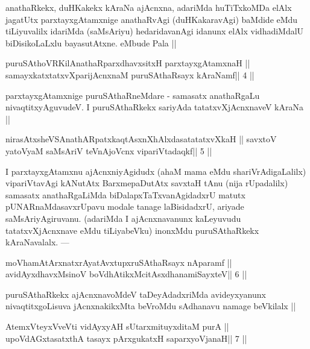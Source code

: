 \begin{artha}
anathaRkekx, duHKakekx kAraNa ajAcnxna, adariMda huTiTxkoMDa elAlx jagatUtx parxtayxgAtamxnige anathaRvAgi (duHKakaravAgi) baMdide eMdu tiLiyuvalilx idariMda (saMsAriyu) hedaridavanAgi idanunx elAlx vidhadiMdalU biDisikoLaLxlu bayasutAtxne. eMbude Pala ||
\end{artha}

\begin{shl}
puruSAthoVR\s KilAnathaRparxdhavxsitxH parxtayxgAtamxnaH ||
samayxkatxtatxvXparijAcnxnaM puruSAthaRsayx kAraNamf\hfill || 4 ||
\end{shl}

\begin{artha}
parxtayxgAtamxnige puruSAthaRneMdare - samasatx anathaRgaLu 
nivaqtitxyAguvudeV. I puruSAthaRkekx sariyAda tatatxvXjAcnxnaveV kAraNa ||
\end{artha}


\begin{shl}
nirasAtxsheVSAnathARpatxkaqtAsxnXhAlxdasatatatxvXkaH ||
savxtoV yatoV\s yaM saMsAriV teVnAjoVcnx vipariVtadaqkf\hfill || 5 ||
\end{shl}

\begin{artha}
I parxtayxgAtamxnu ajAcnxniyAgidudx (ahaM mama eMdu shariVrAdigaLalilx) 
vipariVtavAgi kANutAtx BarxmepaDutAtx savxtaH tAnu (nija rUpadalilx) samasatx anathaRgaLiMda biDalapxTaTxvanAgidadxrU matutx pUNARnaMdasavxrUpavu modale tanage laBisidadxrU, ariyade saMsAriyAgiruvanu. (adariMda I ajAcnxnavanunx kaLeyuvudu tatatxvXjAcnxnave eMdu tiLiyabeVku) inonxMdu puruSAthaRkekx kAraNavalalx. ---
\end{artha}

\begin{shl}
moVhamAtArxnatxrAyatAvxtupxruSAthaRsayx nAparamf ||
avidAyxdhavxMsinoV boVdhAtikxMcitAsxdhanamiSayxteV\hfill || 6 ||
\end{shl}

\begin{artha}
puruSAthaRkekx ajAcnxnavoMdeV taDeyAdadxriMda avideyxyanunx nivaqtitxgoLisuva jAcnxnakikxMta beVroMdu sAdhanavu namage beVkilalx ||
\end{artha}


\begin{shl}
AtemxVteyxVveVti vidAyxyAH sUtarxmituyxditaM purA ||
upoVdAGxtasatxthA tasayx pArxgukatxH saparxyoVjanaH\hfill || 7 ||
\end{shl}

